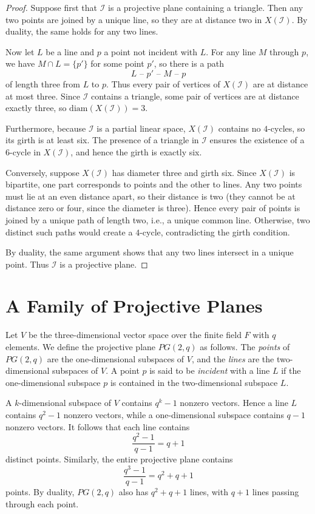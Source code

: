 \documentclass[12pt,a4paper,openany]{book}
\begin{document}
\begin{proof}
Suppose first that $\mathcal{I}$ is a projective plane containing a triangle. Then any two points are joined by a unique line, so they are at distance two in $X(\mathcal{I})$. By duality, the same holds for any two lines.

Now let $L$ be a line and $p$ a point not incident with $L$. For any line $M$ through $p$, we have $M \cap L = \{p'\}$ for some point $p'$, so there is a path
\[
  L \text{ -- } p' \text{ -- } M \text{ -- } p
\]
of length three from $L$ to $p$. Thus every pair of vertices of $X(\mathcal{I})$ are at distance at most three. Since $\mathcal{I}$ contains a triangle, some pair of vertices are at distance exactly three, so $\mathrm{diam}(X(\mathcal{I})) = 3$.

Furthermore, because $\mathcal{I}$ is a partial linear space, $X(\mathcal{I})$ contains no $4$-cycles, so its girth is at least six. The presence of a triangle in $\mathcal{I}$ ensures the existence of a $6$-cycle in $X(\mathcal{I})$, and hence the girth is exactly six.

Conversely, suppose $X(\mathcal{I})$ has diameter three and girth six. Since $X(\mathcal{I})$ is bipartite, one part corresponds to points and the other to lines. Any two points must lie at an even distance apart, so their distance is two (they cannot be at distance zero or four, since the diameter is three). Hence every pair of points is joined by a unique path of length two, i.e., a unique common line. Otherwise, two distinct such paths would create a $4$-cycle, contradicting the girth condition.

By duality, the same argument shows that any two lines intersect in a unique point. Thus $\mathcal{I}$ is a projective plane.
\end{proof}

\section{A Family of Projective Planes}
Let $V$ be the three-dimensional vector space over the finite field $F$ with $q$ elements. We define the projective plane $PG(2,q)$ as follows. The \emph{points} of $PG(2,q)$ are the one-dimensional subspaces of $V$, and the \emph{lines} are the two-dimensional subspaces of $V$. A point $p$ is said to be \emph{incident} with a line $L$ if the one-dimensional subspace $p$ is contained in the two-dimensional subspace $L$.  

A $k$-dimensional subspace of $V$ contains $q^k - 1$ nonzero vectors. Hence a line $L$ contains $q^2 - 1$ nonzero vectors, while a one-dimensional subspace contains $q - 1$ nonzero vectors. It follows that each line contains 
\[
\frac{q^2 - 1}{q - 1} = q+1
\]
distinct points. Similarly, the entire projective plane contains
\[
\frac{q^3 - 1}{q - 1} = q^2 + q + 1
\]
points. By duality, $PG(2,q)$ also has $q^2 + q + 1$ lines, with $q+1$ lines passing through each point.  
\end{document}
